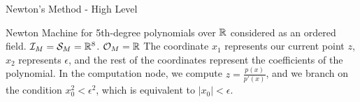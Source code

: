 \documentclass{article}
\begin{document}
{\Huge Newton's Method - High Level}\\


\newpage


Newton Machine for 5th-degree polynomials over $\mathbb{R}$ considered as
an ordered field.  $\mathcal{I}_M = \mathcal{S}_M = \mathbb{R}^8$.
$\mathcal{O}_M = \mathbb{R}$ The coordinate $x_1$ represents our current
point $z$, $x_2$ represents $\epsilon$, and the rest of the
coordinates represent the coefficients of the polynomial. In the
computation node, we compute $z = \frac{p(x)}{p'(x)}$, and we branch
on the condition $x_0^2 < \epsilon^2$, which is equivalent to $|x_0| <
\epsilon$.
\end{document}
